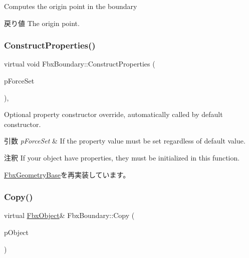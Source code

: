 Computes the origin point in the boundary \begin{DoxyReturn}{戻り値}
The origin point. 
\end{DoxyReturn}
\mbox{\label{class_fbx_boundary_acb50e021b1e9920026c975613a949537}} 
\subsubsection{\texorpdfstring{Construct\+Properties()}{ConstructProperties()}}
{\footnotesize\ttfamily virtual void Fbx\+Boundary\+::\+Construct\+Properties (\begin{DoxyParamCaption}\item[{bool}]{p\+Force\+Set }\end{DoxyParamCaption})\hspace{0.3cm}{\ttfamily [protected]}, {\ttfamily [virtual]}}

Optional property constructor override, automatically called by default constructor. 
\begin{DoxyParams}{引数}
{\em p\+Force\+Set} & If the property value must be set regardless of default value. \\
\hline
\end{DoxyParams}
\begin{DoxyRemark}{注釈}
If your object have properties, they must be initialized in this function. 
\end{DoxyRemark}


\hyperlink{class_fbx_geometry_base_a94ee142ac1d40be3aebb4d9441431921}{Fbx\+Geometry\+Base}を再実装しています。

\mbox{\label{class_fbx_boundary_a6fe59f45c17eeebbabaeff235058ac70}} 
\subsubsection{\texorpdfstring{Copy()}{Copy()}}
{\footnotesize\ttfamily virtual \hyperlink{class_fbx_object}{Fbx\+Object}\& Fbx\+Boundary\+::\+Copy (\begin{DoxyParamCaption}\item[{const \hyperlink{class_fbx_object}{Fbx\+Object} \&}]{p\+Object }\end{DoxyParamCaption})\hspace{0.3cm}{\ttfamily [virtual]}}


